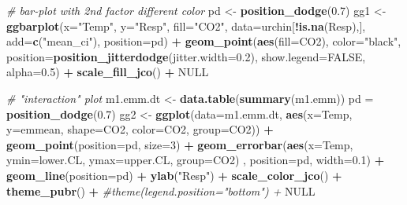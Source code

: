 \documentclass[]{book}
\newenvironment{Shaded}{\begin{snugshade}}{\end{snugshade}}
\newcommand{\CommentTok}[1]{\textcolor[rgb]{0.56,0.35,0.01}{\textit{#1}}}
\newcommand{\DataTypeTok}[1]{\textcolor[rgb]{0.13,0.29,0.53}{#1}}
\newcommand{\DecValTok}[1]{\textcolor[rgb]{0.00,0.00,0.81}{#1}}
\newcommand{\FloatTok}[1]{\textcolor[rgb]{0.00,0.00,0.81}{#1}}
\newcommand{\KeywordTok}[1]{\textcolor[rgb]{0.13,0.29,0.53}{\textbf{#1}}}
\newcommand{\NormalTok}[1]{#1}
\newcommand{\OperatorTok}[1]{\textcolor[rgb]{0.81,0.36,0.00}{\textbf{#1}}}
\newcommand{\OtherTok}[1]{\textcolor[rgb]{0.56,0.35,0.01}{#1}}
\newcommand{\StringTok}[1]{\textcolor[rgb]{0.31,0.60,0.02}{#1}}
\begin{document}
\begin{Shaded}
\begin{Highlighting}[]
\CommentTok{# bar-plot with 2nd factor different color}
\NormalTok{pd <-}\StringTok{ }\KeywordTok{position_dodge}\NormalTok{(}\FloatTok{0.7}\NormalTok{)}
\NormalTok{gg1 <-}\StringTok{ }\KeywordTok{ggbarplot}\NormalTok{(}\DataTypeTok{x=}\StringTok{"Temp"}\NormalTok{,}
          \DataTypeTok{y=}\StringTok{"Resp"}\NormalTok{,}
          \DataTypeTok{fill=}\StringTok{"CO2"}\NormalTok{,}
          \DataTypeTok{data=}\NormalTok{urchin[}\OperatorTok{!}\KeywordTok{is.na}\NormalTok{(Resp),],}
          \DataTypeTok{add=}\KeywordTok{c}\NormalTok{(}\StringTok{"mean_ci"}\NormalTok{),}
          \DataTypeTok{position=}\NormalTok{pd) }\OperatorTok{+}
\StringTok{  }\KeywordTok{geom_point}\NormalTok{(}\KeywordTok{aes}\NormalTok{(}\DataTypeTok{fill=}\NormalTok{CO2), }
             \DataTypeTok{color=}\StringTok{"black"}\NormalTok{, }
             \DataTypeTok{position=}\KeywordTok{position_jitterdodge}\NormalTok{(}\DataTypeTok{jitter.width=}\FloatTok{0.2}\NormalTok{), }
             \DataTypeTok{show.legend=}\OtherTok{FALSE}\NormalTok{, }
             \DataTypeTok{alpha=}\FloatTok{0.5}\NormalTok{) }\OperatorTok{+}
\StringTok{  }\KeywordTok{scale_fill_jco}\NormalTok{() }\OperatorTok{+}
\StringTok{  }\OtherTok{NULL}

\CommentTok{# "interaction" plot}
\NormalTok{m1.emm.dt <-}\StringTok{ }\KeywordTok{data.table}\NormalTok{(}\KeywordTok{summary}\NormalTok{(m1.emm))}
\NormalTok{pd =}\StringTok{ }\KeywordTok{position_dodge}\NormalTok{(}\FloatTok{0.7}\NormalTok{)}
\NormalTok{gg2 <-}\StringTok{ }\KeywordTok{ggplot}\NormalTok{(}\DataTypeTok{data=}\NormalTok{m1.emm.dt, }
                      \KeywordTok{aes}\NormalTok{(}\DataTypeTok{x=}\NormalTok{Temp, }
                          \DataTypeTok{y=}\NormalTok{emmean, }
                          \DataTypeTok{shape=}\NormalTok{CO2, }
                          \DataTypeTok{color=}\NormalTok{CO2, }
                          \DataTypeTok{group=}\NormalTok{CO2)) }\OperatorTok{+}
\StringTok{  }\KeywordTok{geom_point}\NormalTok{(}\DataTypeTok{position=}\NormalTok{pd, }\DataTypeTok{size=}\DecValTok{3}\NormalTok{) }\OperatorTok{+}
\StringTok{  }\KeywordTok{geom_errorbar}\NormalTok{(}\KeywordTok{aes}\NormalTok{(}\DataTypeTok{x=}\NormalTok{Temp, }
                                 \DataTypeTok{ymin=}\NormalTok{lower.CL, }
                                 \DataTypeTok{ymax=}\NormalTok{upper.CL,}
                                 \DataTypeTok{group=}\NormalTok{CO2)}
\NormalTok{                , }\DataTypeTok{position=}\NormalTok{pd, }\DataTypeTok{width=}\FloatTok{0.1}\NormalTok{) }\OperatorTok{+}
\StringTok{  }\KeywordTok{geom_line}\NormalTok{(}\DataTypeTok{position=}\NormalTok{pd) }\OperatorTok{+}
\StringTok{  }\KeywordTok{ylab}\NormalTok{(}\StringTok{"Resp"}\NormalTok{) }\OperatorTok{+}
\StringTok{  }\KeywordTok{scale_color_jco}\NormalTok{() }\OperatorTok{+}
\StringTok{  }\KeywordTok{theme_pubr}\NormalTok{() }\OperatorTok{+}
\StringTok{  }\CommentTok{#theme(legend.position="bottom") +}
\StringTok{  }\OtherTok{NULL}


\end{Highlighting}
\end{Shaded}
\end{document}
